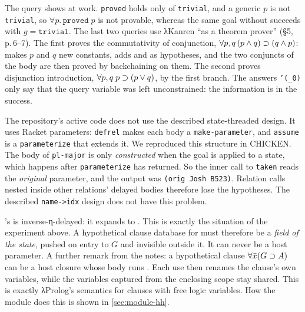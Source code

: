 \noindent The query  shows  at work. \texttt{proved} holds only of
\texttt{trivial}, and a generic $p$ is not \texttt{trivial}, so $\forall p.\,\texttt{proved}\;p$ is not
provable, whereas the same goal without  succeeds with $g=\texttt{trivial}$. The last two queries
use λKanren \enquote{as a theorem prover} (§5, p.\,6--7). The first proves the commutativity of
conjunction, $\forall p,q\,(p\wedge q)\supset(q\wedge p)$:  makes $p$ and $q$ new
constants,  adds  and  as hypotheses, and the two
conjuncts of the body are then proved by backchaining on them. The second proves disjunction introduction,
$\forall p,q\;p\supset(p\vee q)$, by the first  branch. The answers \texttt{'(\_0)} only say that
the query variable was left unconstrained: the information is in the success.

\begin{pitfall}
The repository's active code does not use the described state-threaded design. It uses Racket
parameters: \texttt{defrel} makes each body a \texttt{make-parameter}, and \texttt{assume} is a
\texttt{parameterize} that extends it. We reproduced this structure in CHICKEN. The body
of \texttt{pl-major} is only \emph{constructed} when the goal is applied to a state, which happens
after \texttt{parameterize} has returned. So the inner call to \texttt{taken} reads the
\emph{original} parameter, and the output was \texttt{(orig Josh B523)}. Relation calls nested inside
other relations' delayed bodies therefore lose the hypotheses. The described \texttt{name->idx} design
does not have this problem.
\end{pitfall}

\begin{kanren}
\micro{}'s  is inverse-η-delayed: it expands to
. This is exactly the situation of the experiment above. A
hypothetical clause database for  must therefore be a \emph{field of the state},
pushed on entry to $G$ and invisible outside it. It can never be a host parameter. A further remark
from the notes: a hypothetical clause $\forall\bar x(G\supset A)$ can be a host closure whose body runs
. Each use then renames the clause's own variables, while the variables captured from
the enclosing scope stay shared. This is exactly λProlog's semantics for clauses with free logic
variables. How the module does this is shown in \cref{sec:module-hh}.
\end{kanren}

